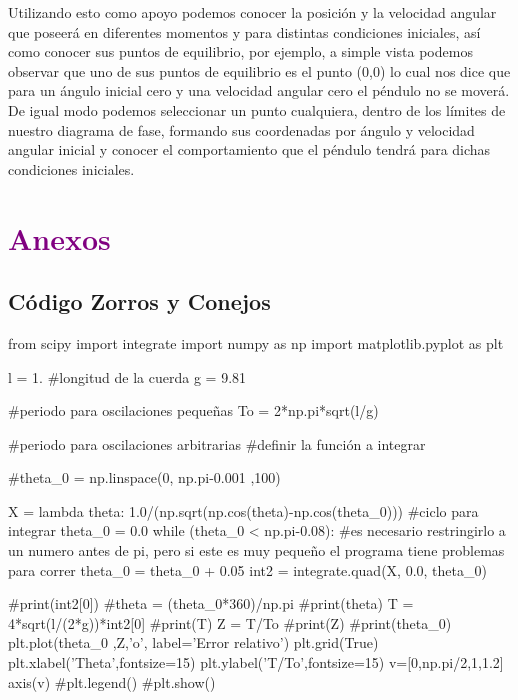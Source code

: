 \documentclass[12pt]{article}
\begin{document}
Utilizando esto como apoyo podemos conocer la posición y la velocidad angular que poseerá en diferentes momentos y para distintas condiciones iniciales, así como conocer sus puntos de equilibrio, por ejemplo, a simple vista podemos observar que uno de sus puntos de equilibrio es el punto (0,0) lo cual nos dice que para un ángulo inicial cero y una velocidad angular cero el péndulo no se moverá.\\

De igual modo podemos seleccionar un punto cualquiera, dentro de los límites de nuestro diagrama de fase, formando sus coordenadas por ángulo y velocidad angular inicial y conocer el comportamiento que el péndulo tendrá para dichas condiciones iniciales.



\section*{\textcolor{Purple}{Anexos}}
\subsection*{\textcolor{RubineRed}{Código Zorros y Conejos}}
\begin{boxedverbatim}
from scipy import integrate
import numpy as np
import matplotlib.pyplot as plt

l = 1. #longitud de la cuerda
g = 9.81

#periodo para oscilaciones pequeñas
To = 2*np.pi*sqrt(l/g) 

#periodo para oscilaciones arbitrarias
#definir la función a integrar

#theta_0 = np.linspace(0, np.pi-0.001 ,100)

X = lambda theta: 1.0/(np.sqrt(np.cos(theta)-np.cos(theta_0)))
#ciclo para integrar
theta_0 = 0.0
while (theta_0 < np.pi-0.08): 
#es necesario restringirlo a un numero antes de pi, 
pero si este es muy pequeño 
el programa tiene problemas para correr
    theta_0 = theta_0 + 0.05
    int2 = integrate.quad(X, 0.0, theta_0)    
    
    #print(int2[0])
    #theta = (theta_0*360)/np.pi
    #print(theta)
    T = 4*sqrt(l/(2*g))*int2[0]
    #print(T)
    Z = T/To
    #print(Z)
    #print(theta_0)
    plt.plot(theta_0 ,Z,'o', label='Error relativo')
    plt.grid(True)
    plt.xlabel('Theta',fontsize=15)
    plt.ylabel('T/To',fontsize=15)
    v=[0,np.pi/2,1,1.2]
    axis(v)
    #plt.legend()
    #plt.show()
\end{boxedverbatim}
\end{document}
